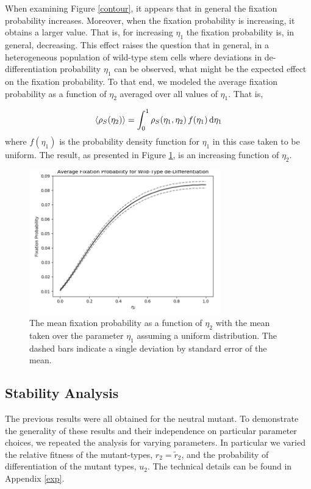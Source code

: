 \documentclass[12pt]{article}
\renewcommand{\d}{{\rm d}}
\begin{document}
When examining Figure \ref{contour}, it appears that in general the fixation probability increases. Moreover, when the fixation probability is increasing, it obtains a larger value. That is, for increasing $\eta_1$ the fixation probability is, in general, decreasing. This effect raises the question that in general, in a heterogeneous population of wild-type stem cells where deviations in de-differentiation probability $\eta_1$ can be observed, what might be the expected effect on the fixation probability. To that end, we modeled the average fixation probability as a function of $\eta_2$ averaged over all values of $\eta_1$. That is,

\[\langle\rho_S(\eta_2)\rangle = \int_0^1 \rho_S(\eta_1, \eta_2)\,f(\eta_1)\,\d \eta_1\]
where $f(\eta_1)$ is the probability density function for $\eta_1$ in this case taken to be uniform. The result, as presented in Figure \ref{avg_eta1_plot}, is an increasing function of $\eta_2$.

\begin{figure}[!ht]
\begin{center}
\includegraphics[width=0.74\textwidth]{avg_eta1_plot.png}
\end{center}
\caption{The mean fixation probability as a function of $\eta_2$ with the mean taken over the parameter $\eta_1$ assuming a uniform distribution. The dashed bars indicate a single deviation by standard error of the mean.}\label{avg_eta1_plot}
\end{figure}

\subsection{Stability Analysis}

The previous results were all obtained for the neutral mutant. To demonstrate the generality of these results and their independence on particular parameter choices, we repeated the analysis for varying parameters. In particular we varied the relative fitness of the mutant-types, $r_2=\tilde{r}_2$, and the probability of differentiation of the mutant types, $u_2$. The technical details can be found in Appendix \ref{exp}.
\end{document}

